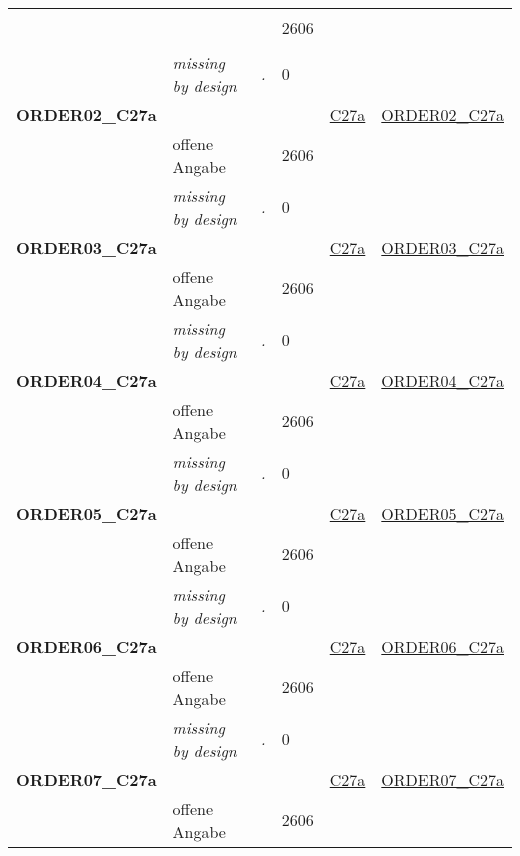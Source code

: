 \begin{longtable}{| L{2.45cm} | L{6cm} | C{1.5cm} | R{1cm} | C{2.25cm} | C{2.25cm} |}
   & \protect\subsection[Variablen ORDER01\_C27a bis D13b]{} &  & 2606 &  &  \\ 
   & \textit{missing by design} & \textit{.} & 0 &  &  \\ 
   \midrule
\textbf{ORDER02\_C27a}\label{var:ORDER02:C27a} & \textbf{} &  &  & \hyperref[C27a]{C27a} & \hyperref[var:suf:ORDER02:C27a]{ORDER02\_C27a} \\ 
   & offene Angabe &  & 2606 &  &  \\ 
   & \textit{missing by design} & \textit{.} & 0 &  &  \\ 
   \midrule
\textbf{ORDER03\_C27a}\label{var:ORDER03:C27a} & \textbf{} &  &  & \hyperref[C27a]{C27a} & \hyperref[var:suf:ORDER03:C27a]{ORDER03\_C27a} \\ 
   & offene Angabe &  & 2606 &  &  \\ 
   & \textit{missing by design} & \textit{.} & 0 &  &  \\ 
   \midrule
\textbf{ORDER04\_C27a}\label{var:ORDER04:C27a} & \textbf{} &  &  & \hyperref[C27a]{C27a} & \hyperref[var:suf:ORDER04:C27a]{ORDER04\_C27a} \\ 
   & offene Angabe &  & 2606 &  &  \\ 
   & \textit{missing by design} & \textit{.} & 0 &  &  \\ 
   \midrule
\textbf{ORDER05\_C27a}\label{var:ORDER05:C27a} & \textbf{} &  &  & \hyperref[C27a]{C27a} & \hyperref[var:suf:ORDER05:C27a]{ORDER05\_C27a} \\ 
   & offene Angabe &  & 2606 &  &  \\ 
   & \textit{missing by design} & \textit{.} & 0 &  &  \\ 
   \midrule
\textbf{ORDER06\_C27a}\label{var:ORDER06:C27a} & \textbf{} &  &  & \hyperref[C27a]{C27a} & \hyperref[var:suf:ORDER06:C27a]{ORDER06\_C27a} \\ 
   & offene Angabe &  & 2606 &  &  \\ 
   & \textit{missing by design} & \textit{.} & 0 &  &  \\ 
   \midrule
\textbf{ORDER07\_C27a}\label{var:ORDER07:C27a} & \textbf{} &  &  & \hyperref[C27a]{C27a} & \hyperref[var:suf:ORDER07:C27a]{ORDER07\_C27a} \\ 
   & offene Angabe &  & 2606 &  &  \\ 

\end{longtable}
